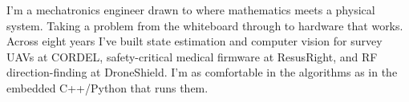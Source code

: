 %
%
%
\par{
I'm a mechatronics engineer drawn to where mathematics meets a physical system. Taking a problem from the whiteboard
through to hardware that works. Across eight years I've built state estimation and computer vision for survey UAVs at
CORDEL, safety-critical medical firmware at ResusRight, and RF direction-finding at DroneShield. I'm as comfortable in
the algorithms as in the embedded C++/Python that runs them.
}
